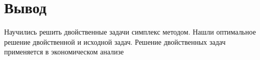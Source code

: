 \documentclass[a4paper, 12pt]{article}
\begin{document}
\section{Вывод}
Научились решить двойственные задачи симплекс методом. Нашли оптимальное решение двойственной и исходной задач. Решение двойственных задач применяется в экономическом анализе
\end{document}
